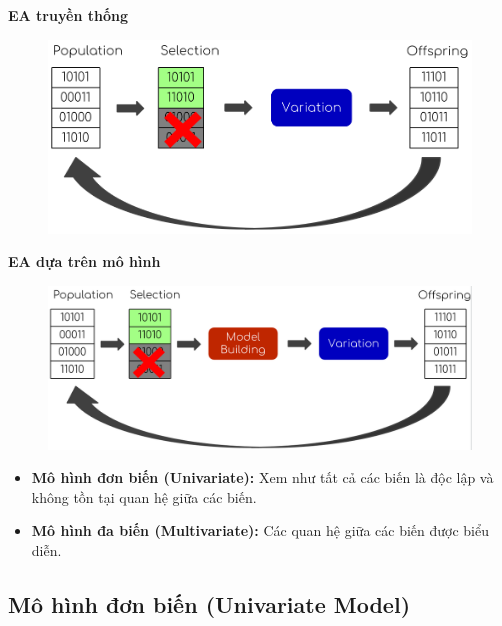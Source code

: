 \documentclass{book}
\begin{document}
    \textbf{EA truyền thống}
    \begin{figure}[H]
        \centering
        \includegraphics[width=1.0\linewidth]{images/EAtraditional.png}
        \label{fig:EAtraditional}
    \end{figure}
    \textbf{EA dựa trên mô hình}
    \begin{figure}[H]
        \centering
        \includegraphics[width=1.0\linewidth]{images/EAmodel.png}
        \label{fig:EAmodel}
    \end{figure}
    \begin{itemize}
        \item \textbf{Mô hình đơn biến (Univariate):} Xem như tất cả các biến là độc lập và không tồn tại quan hệ giữa các biến.
        \item \textbf{Mô hình đa biến (Multivariate):} Các quan hệ giữa các biến được biểu diễn.
    \end{itemize}
    
        \subsection{Mô hình đơn biến (Univariate Model)}
        
\end{document}

